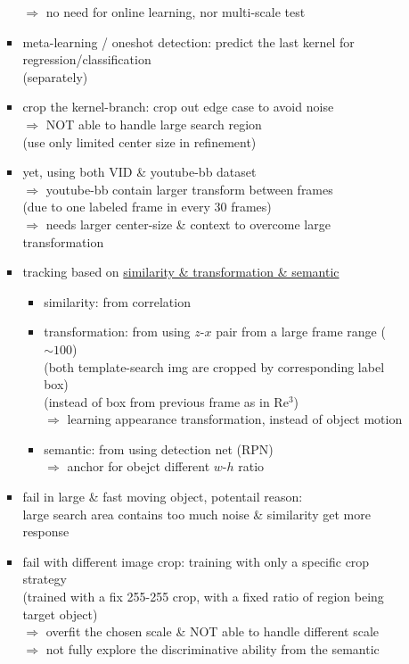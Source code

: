 \begin{itemize}
\begin{itemize}
\begin{itemize}
		$\Rightarrow$ no need for online learning, nor multi-scale test
		\item meta-learning / oneshot detection: predict the last kernel for regression/classification \\
		(separately)
		\item crop the kernel-branch: crop out edge case to avoid noise \\
		$\Rightarrow$ NOT able to handle large search region \\ 
		(use only limited center size in refinement)
		\item yet, using both VID \& youtube-bb dataset \\
		$\Rightarrow$ youtube-bb contain larger transform between frames \\
		(due to one labeled frame in every 30 frames) \\
		$\Rightarrow$ needs larger center-size \& context to overcome large transformation
		\item tracking based on \underline{similarity \& transformation \& semantic}
			\begin{itemize}
			\item similarity: from correlation
			\item transformation: from using $z$-$x$ pair from a large frame range ($\sim100$) \\
			(both template-search img are cropped by corresponding label box) \\
			(instead of box from previous frame as in Re$^3$) \\
			$\Rightarrow$ learning appearance transformation, instead of object motion
			\item semantic: from using detection net (RPN) \\
			$\Rightarrow$ anchor for obejct different $w$-$h$ ratio
			\end{itemize}
		\item fail in large \& fast moving object, potentail reason: \\
		large search area contains too much noise \& similarity get more response
		\item fail with different image crop: training with only a specific crop strategy \\
		(trained with a fix 255-255 crop, with a fixed ratio of region being target object) \\
		$\Rightarrow$ overfit the chosen scale \& NOT able to handle different scale \\
		$\Rightarrow$ not fully explore the discriminative ability from the semantic

\end{itemize}
\end{itemize}
\end{itemize}
